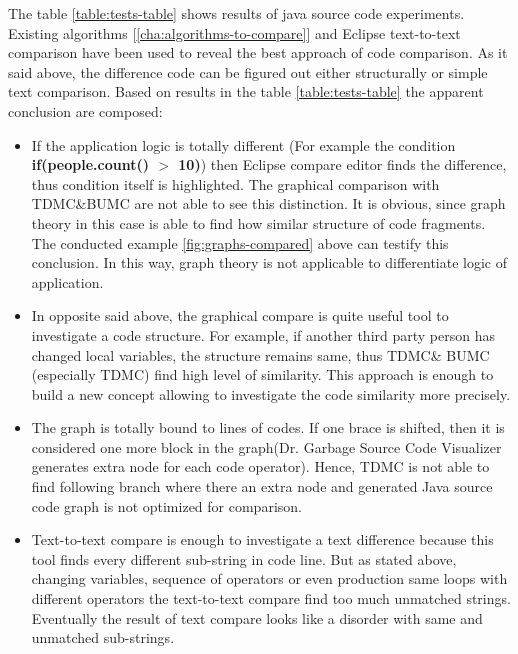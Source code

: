 \documentclass{report}
\begin{document}
The table \ref{table:tests-table} shows results of java source code experiments. Existing algorithms [\ref{cha:algorithms-to-compare}] and Eclipse text-to-text comparison have been used to reveal the best approach of code comparison. As it said above, the difference code can be figured out either structurally or simple text comparison. Based on results in the table \ref{table:tests-table} the apparent conclusion are composed:
\begin{itemize}
	\item If the application logic is totally different (For example the condition \\ \textbf{if(people.count() $>$ 10)}) then Eclipse compare editor finds the difference, thus condition itself is highlighted. The graphical comparison with  TDMC\&BUMC  are not able to see this distinction. It is obvious, since graph theory in this case is able to find how similar structure of code fragments. The conducted example \ref{fig:graphs-compared} above can testify this conclusion. In this way, graph theory is not applicable to differentiate logic of application.
	
	\item In opposite said above, the graphical compare is quite useful tool to investigate a code structure. For example, if another third party person has changed local variables, the structure remains same, thus TDMC\& BUMC (especially TDMC) find high level of similarity. This approach is enough to build a new concept allowing to investigate the code similarity more precisely. 
	
	\item The graph is totally bound to lines of codes. If one brace is shifted, then it is considered one more block in the graph(Dr. Garbage Source Code Visualizer \cite{drgarbage} generates extra node for each code operator). Hence, TDMC is not able to find following branch where there an extra node and generated Java source code graph is not optimized for comparison.
	
	\item Text-to-text compare is enough to investigate a text difference because this tool finds every different sub-string in code line. But as stated above, changing variables, sequence of operators or even production same loops with different operators the text-to-text compare find too much unmatched strings. Eventually the result of text compare looks like a disorder with same and unmatched sub-strings.  	

\end{itemize}
\end{document}
